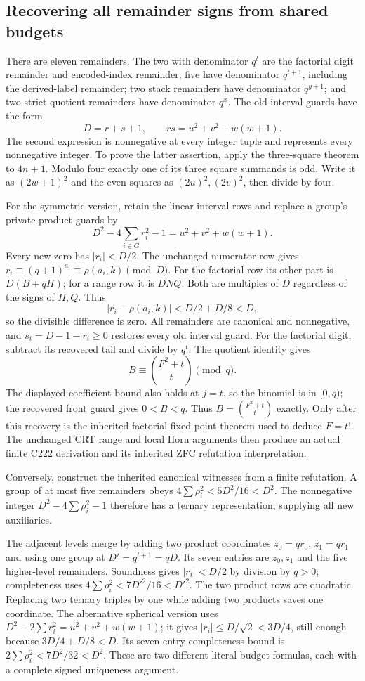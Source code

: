 \subsection{Recovering all remainder signs from shared budgets}
There are eleven remainders. The two with denominator $q^t$ are the
factorial digit remainder and encoded-index remainder; five have denominator
$q^{t+1}$, including the derived-label remainder; two stack remainders have
denominator $q^{y+1}$; and two strict quotient remainders have denominator
$q^x$. The old interval guards have the form
\[
 D=r+s+1,\qquad rs=u^2+v^2+w(w+1).
\]
The second expression is nonnegative at every integer tuple and represents
every nonnegative integer. To prove the latter assertion, apply the
three-square theorem to $4n+1$. Modulo four exactly one of its three square
summands is odd. Write it as $(2w+1)^2$ and the even squares as
$(2u)^2,(2v)^2$, then divide by four.

For the symmetric version, retain the linear interval rows and replace a
group's private product guards by
\begin{equation}\label{eq:symmetricbudget}
 D^2-4\sum_{i\in G}r_i^2-1=u^2+v^2+w(w+1).
\end{equation}
Every new zero has $|r_i|<D/2$. The unchanged numerator row gives
$r_i\equiv(q+1)^{a_i}\equiv\rho(a_i,k)\pmod D$. For the factorial
row its other part is $D(B+qH)$; for a range row it is $DNQ$. Both are
multiples of $D$ regardless of the signs of $H,Q$. Thus
\[
 |r_i-\rho(a_i,k)|<D/2+D/8<D,
\]
so the divisible difference is zero. All remainders are canonical and
nonnegative, and $s_i=D-1-r_i\ge0$ restores every old interval guard.
For the factorial digit, subtract its recovered tail and divide by $q^t$.
The quotient identity gives
\[
 B\equiv\binom{F^2+t}{t}\pmod q.
\]
The displayed coefficient bound also holds at $j=t$, so the binomial is
in $[0,q)$; the recovered front guard gives $0<B<q$. Thus
$B=\binom{F^2+t}{t}$ exactly. Only after this recovery is the inherited
factorial fixed-point theorem used to deduce $F=t!$. The unchanged CRT range and local Horn arguments
then produce an actual finite C222 derivation and its inherited ZFC
refutation interpretation.

Conversely, construct the inherited canonical witnesses from a finite
refutation. A group of at most five remainders obeys
$4\sum\rho_i^2<5D^2/16<D^2$. The nonnegative integer
$D^2-4\sum\rho_i^2-1$ therefore has a ternary representation, supplying
all new auxiliaries.

The adjacent levels merge by adding two product coordinates
$z_0=qr_0$, $z_1=qr_1$ and using one group at
$D'=q^{t+1}=qD$. Its seven entries are $z_0,z_1$ and the five higher-level
remainders. Soundness gives $|r_i|<D/2$ by division by $q>0$; completeness
uses $4\sum\rho_i^2<7D'^2/16<D'^2$. The two product rows are quadratic.
Replacing two ternary triples by one while adding two products saves one
coordinate. The alternative spherical version uses
$D^2-2\sum r_i^2=u^2+v^2+w(w+1)$; it gives
$|r_i|\le D/\sqrt2<3D/4$, still enough because $3D/4+D/8<D$.
Its seven-entry completeness bound is $2\sum\rho_i^2<7D^2/32<D^2$.
These are two different literal budget formulas, each with a complete
signed uniqueness argument.

